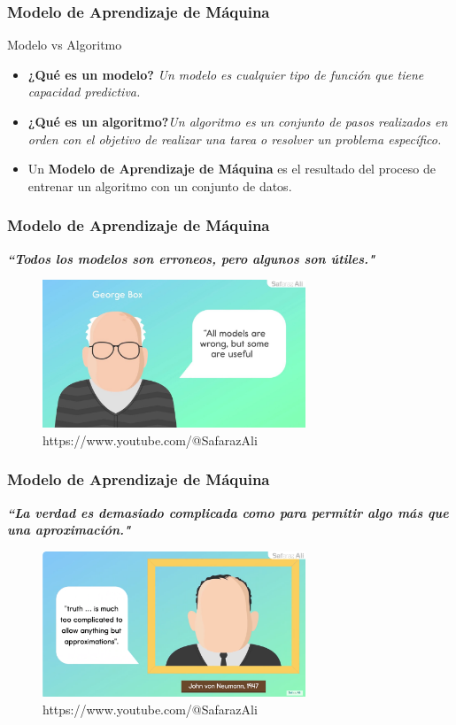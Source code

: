 \documentclass{beamer}
\begin{document}
\begin{frame}
	\frametitle{Modelo de Aprendizaje de Máquina}
					\begin{block}{Modelo vs Algoritmo}	
	\begin{itemize}
		\item \textbf{¿Qué es un modelo?} \textit{Un modelo es cualquier tipo de función que tiene capacidad predictiva.}
		\item\textbf{¿Qué es un algoritmo?}\textit{Un algoritmo es un conjunto de pasos realizados en orden  con el objetivo de realizar una tarea o resolver un problema específico.}
		\item Un \textbf{Modelo de Aprendizaje de Máquina} es el resultado del proceso de entrenar un algoritmo con un conjunto de datos.
	\end{itemize}
\end{block}
\end{frame}
	
	
\begin{frame}
\frametitle{Modelo de Aprendizaje de Máquina}
\textit{\textbf{``Todos los modelos son erroneos, pero algunos son útiles."}}
\begin{figure}
	\includegraphics[width=0.7\textwidth]{Box_imagen.jpg}
	\caption{https://www.youtube.com/@SafarazAli}
\end{figure}
\end{frame}

 	
	
\begin{frame}
\frametitle{Modelo de Aprendizaje de Máquina}
\textit{\textbf{``La verdad es demasiado complicada como para permitir algo más que una aproximación."}}
\begin{figure}
	\includegraphics[width=0.7\textwidth]{Von_Newman_imagen}
	\caption{https://www.youtube.com/@SafarazAli}
\end{figure}
\end{frame}
	
\end{document}

